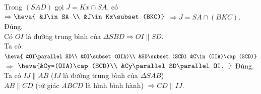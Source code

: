 \begin{ex}
{\begin{itemchoice}
			Trong  $(SAD)$ gọi $J=Kx \cap SA$, có $\Rightarrow
			\heva{ 
			&J\in SA  \\
			&J\in  Kx\subset (BKC)}$
			 $\Rightarrow J=SA\cap (BKC)$.
			\itemch Đúng.\\ 
			Có ${O I}$ là đường  trung bình của $\Delta SBD\Rightarrow OI\parallel SD$.\\
			Ta có: $\heva{ 
			 &OI\parallel SD\\
			&OI\subset (OIA)\\ 
			 &SD\subset (SCD)
			&C\in (OIA)\cap  (SCD)}$
			$\Rightarrow $ 
			$\heva{&Cy=(OIA)\cap (SCD)\\ &Cy\parallel SD\parallel OI.  }$
			\itemch Đúng.\\ 
			Ta có 
			$IJ\parallel AB$ ($IJ$ là đường trung bình của $\Delta  SAB$)\\
			 $AB\parallel CD$ (tứ giác $ABCD$ là hình bình hành) $\Rightarrow CD\parallel IJ$.
		\end{itemchoice}
	} 
\end{ex}


